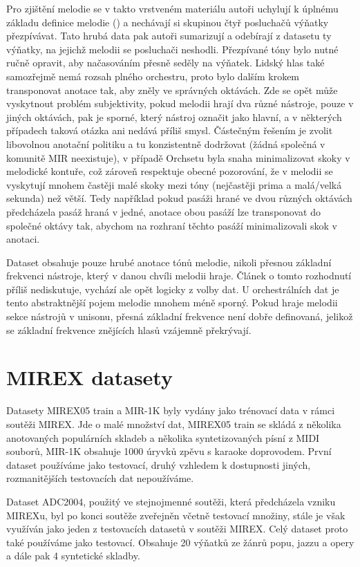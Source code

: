 Pro zjištění melodie se v takto vrstveném materiálu autoři uchylují k úplnému základu definice melodie (\cite{Poliner2007}) a nechávají si skupinou čtyř posluchačů výňatky přezpívávat. Tato hrubá data pak autoři sumarizují a odebírají z datasetu ty výňatky, na jejichž melodii se posluchači neshodli. Přezpívané tóny bylo nutné ručně opravit, aby načasováním přesně seděly na výňatek. Lidský hlas také samozřejmě nemá rozsah plného orchestru, proto bylo dalším krokem transponovat anotace tak, aby zněly ve správných oktávách. Zde se opět může vyskytnout problém subjektivity, pokud melodii hrají dva různé nástroje, pouze v jiných oktávách, pak je sporné, který nástroj označit jako hlavní, a v některých případech taková otázka ani nedává příliš smysl. Částečným řešením je zvolit libovolnou anotační politiku a tu konzistentně dodržovat (žádná společná v komunitě MIR neexistuje), v případě Orchsetu byla snaha minimalizovat skoky v melodické kontuře, což zároveň respektuje obecné pozorování, že v melodii se vyskytují mnohem častěji malé skoky mezi tóny (nejčastěji prima a malá/velká sekunda) než větší. Tedy například pokud pasáži hrané ve dvou různých oktávách předcházela pasáž hraná v jedné, anotace obou pasáží lze transponovat do společné oktávy tak, abychom na rozhraní těchto pasáží minimalizovali skok v anotaci.

Dataset obsahuje pouze hrubé anotace tónů melodie, nikoli přesnou základní frekvenci nástroje, který v danou chvíli melodii hraje. Článek o tomto rozhodnutí příliš nediskutuje, vychází ale opět logicky z volby dat. U orchestrálních dat je tento abstraktnější pojem melodie mnohem méně sporný. Pokud hraje melodii sekce nástrojů v unisonu, přesná základní frekvence není dobře definovaná, jelikož se základní frekvence znějících hlasů vzájemně překrývají.

\section{MIREX datasety}

Datasety MIREX05 train a MIR-1K byly vydány jako trénovací data v rámci soutěži MIREX. Jde o malé množství dat, MIREX05 train se skládá z několika anotovaných populárních skladeb a několika syntetizovaných písní z MIDI souborů, MIR-1K obsahuje 1000 úryvků zpěvu s karaoke doprovodem. První dataset používáme jako testovací, druhý vzhledem k dostupnosti jiných, rozmanitějších testovacích dat nepoužíváme. 

Dataset ADC2004, použitý ve stejnojmenné soutěži, která předcházela vzniku MIREXu, byl po konci soutěže zveřejněn včetně testovací množiny, stále je však využíván jako jeden z testovacích datasetů v soutěži MIREX. Celý dataset proto také používáme jako testovací. Obsahuje 20 výňatků ze žánrů popu, jazzu a opery a dále pak 4 syntetické skladby. 

